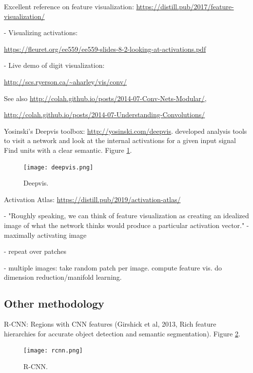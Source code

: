 \documentclass[english]{article}
\begin{document}
\item Excellent reference on feature visualization: \url{https://distill.pub/2017/feature-visualization/}

- Visualizing activations: 

\url{https://fleuret.org/ee559/ee559-slides-8-2-looking-at-activations.pdf}


- Live demo of digit visualization: 

\url{http://scs.ryerson.ca/~aharley/vis/conv/}


\item See also \url{http://colah.github.io/posts/2014-07-Conv-Nets-Modular/}, 

\url{http://colah.github.io/posts/2014-07-Understanding-Convolutions/}

Yosinski's Deepvis toolbox: \url{http://yosinski.com/deepvis}. developed analysis tools to visit a network and look at the
internal activations for a given input signal Find units with a clear semantic. Figure \ref{Deepvis}.


\begin{figure}
  \centering
  \texttt{[image: deepvis.png]}
    \caption{Deepvis.}
    \label{Deepvis}
\end{figure}
\item 
Activation Atlas: \url{https://distill.pub/2019/activation-atlas/}

- "Roughly speaking, we can think of feature visualization as creating an idealized image of what the network thinks would produce a particular activation vector." - maximally activating image

- repeat over patches

- multiple images: take random patch per image. compute feature vis. do dimension reduction/manifold learning.

\eenum



\subsection{Other methodology}
\benum
\item R-CNN: Regions with CNN features (Girshick et al, 2013, Rich feature hierarchies for accurate object detection and semantic segmentation). Figure \ref{rcnn}.


\begin{figure}
  \centering
  \texttt{[image: rcnn.png]}
    \caption{R-CNN.}
    \label{rcnn}
\end{figure}
\end{document}
